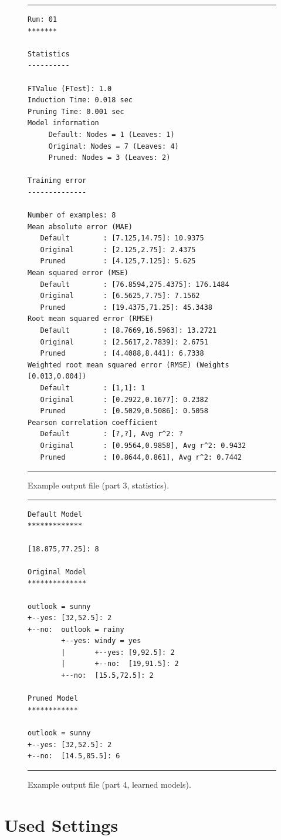 \documentclass[a4paper]{report}
\begin{document}
\begin{figure}[tb]
\hrule
\footnotesize
\begin{verbatim}
Run: 01
*******

Statistics
----------

FTValue (FTest): 1.0
Induction Time: 0.018 sec
Pruning Time: 0.001 sec
Model information
     Default: Nodes = 1 (Leaves: 1)
     Original: Nodes = 7 (Leaves: 4)
     Pruned: Nodes = 3 (Leaves: 2)

Training error
--------------

Number of examples: 8
Mean absolute error (MAE)
   Default        : [7.125,14.75]: 10.9375
   Original       : [2.125,2.75]: 2.4375
   Pruned         : [4.125,7.125]: 5.625
Mean squared error (MSE)
   Default        : [76.8594,275.4375]: 176.1484
   Original       : [6.5625,7.75]: 7.1562
   Pruned         : [19.4375,71.25]: 45.3438
Root mean squared error (RMSE)
   Default        : [8.7669,16.5963]: 13.2721
   Original       : [2.5617,2.7839]: 2.6751
   Pruned         : [4.4088,8.441]: 6.7338
Weighted root mean squared error (RMSE) (Weights [0.013,0.004])
   Default        : [1,1]: 1
   Original       : [0.2922,0.1677]: 0.2382
   Pruned         : [0.5029,0.5086]: 0.5058
Pearson correlation coefficient
   Default        : [?,?], Avg r^2: ?
   Original       : [0.9564,0.9858], Avg r^2: 0.9432
   Pruned         : [0.8644,0.861], Avg r^2: 0.7442
\end{verbatim}
\hrule
\caption{Example output file (part 3, statistics).}
\label{output3:fig}
\end{figure}

\begin{figure}[tb]
\hrule
\begin{verbatim}
Default Model
*************

[18.875,77.25]: 8

Original Model
**************

outlook = sunny
+--yes: [32,52.5]: 2
+--no:  outlook = rainy
        +--yes: windy = yes
        |       +--yes: [9,92.5]: 2
        |       +--no:  [19,91.5]: 2
        +--no:  [15.5,72.5]: 2

Pruned Model
************

outlook = sunny
+--yes: [32,52.5]: 2
+--no:  [14.5,85.5]: 6
\end{verbatim}
\hrule
\caption{Example output file (part 4, learned models).}
\label{output4:fig}
\end{figure}

\section{Used Settings}
\end{document}
